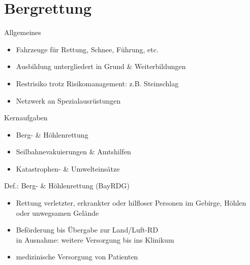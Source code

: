 \section{Bergrettung}
\begin{sectionbox}{Allgemeines}
    \begin{itemize}
        \item Fahrzeuge für Rettung, Schnee, Führung, etc. 
        \item Ausbildung untergliedert in Grund \& Weiterbildungen
        \item Restrisiko trotz Risikomanagement: z.B. Steinschlag
        \item Netzwerk an Spezialausrüstungen
    \end{itemize}
\end{sectionbox}
\begin{sectionbox}{Kernaufgaben}
    \begin{itemize}
        \item Berg- \& Höhlenrettung
        \item Seilbahnevakuierungen \& Amtshilfen
        \item Katastrophen- \& Umwelteinsätze 
    \end{itemize}
\end{sectionbox}
\begin{warningbox}{Def.: Berg- \& Höhlenrettung (BayRDG)}
    \begin{itemize}
        \item Rettung verletzter, erkrankter oder hilfloser Personen im Gebirge, Höhlen oder unwegsamen Gelände
        \item Beförderung bis Übergabe zur Land/Luft-RD\\
        \ra in Ausnahme: weitere Versorgung bis ins Klinikum
        \item medizinische Versorgung von Patienten
    \end{itemize}
\end{warningbox}